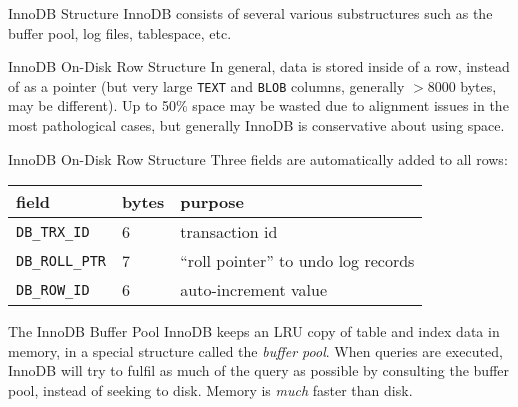\documentclass[14pt]{beamer}
\begin{document}
\begin{frame}{InnoDB Structure}
  InnoDB consists of several various substructures such as the buffer pool, log
  files, tablespace, etc.
\end{frame}

\begin{frame}{InnoDB On-Disk Row Structure}
  In general, data is stored inside of a row, instead of as a pointer (but very
  large \texttt{TEXT} and \texttt{BLOB} columns, generally $>8000$ bytes, may be
  different).
  \newline
  \newline
  Up to 50\% space may be wasted due to alignment issues in the most
  pathological cases, but generally InnoDB is conservative about using space.
\end{frame}

\begin{frame}{InnoDB On-Disk Row Structure}
  Three fields are automatically added to all rows:
  \begin{table}[ht]
    \begin{tabular}{l l l}
      field                  & bytes & purpose \\ \hline
      \texttt{DB\_TRX\_ID}   & 6     & transaction id \\
      \texttt{DB\_ROLL\_PTR} & 7     & ``roll pointer'' to undo log records \\
      \texttt{DB\_ROW\_ID}   & 6     & auto-increment value
    \end{tabular}
  \end{table}
\end{frame}

\begin{frame}{The InnoDB Buffer Pool}
  InnoDB keeps an LRU copy of table and index data in memory, in a special
  structure called the \emph{buffer pool}. When queries are executed, InnoDB
  will try to fulfil as much of the query as possible by consulting the buffer
  pool, instead of seeking to disk.
  \newline
  \newline
  Memory is \emph{much} faster than disk.
\end{frame}
\end{document}
